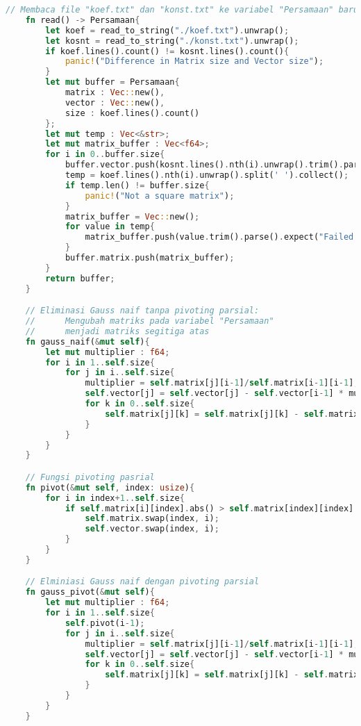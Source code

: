 \documentclass[12pt]{article}
\begin{document}
\begin{enumerate}
{\begin{lstlisting}[language=Rust, style=colouredRust, basicstyle=\fontsize{7.5pt}{10pt}\selectfont\color{white}\ttfamily]
    // Membaca file "koef.txt" dan "konst.txt" ke variabel "Persamaan" baru
    fn read() -> Persamaan{
        let koef = read_to_string("./koef.txt").unwrap();
        let kosnt = read_to_string("./konst.txt").unwrap();
        if koef.lines().count() != kosnt.lines().count(){
            panic!("Difference in Matrix size and Vector size");
        }
        let mut buffer = Persamaan{
            matrix : Vec::new(),
            vector : Vec::new(),
            size : koef.lines().count()
        };
        let mut temp : Vec<&str>;
        let mut matrix_buffer : Vec<f64>;
        for i in 0..buffer.size{
            buffer.vector.push(kosnt.lines().nth(i).unwrap().trim().parse().expect("Failed to parse"));
            temp = koef.lines().nth(i).unwrap().split(' ').collect();
            if temp.len() != buffer.size{
                panic!("Not a square matrix");
            }
            matrix_buffer = Vec::new();
            for value in temp{
                matrix_buffer.push(value.trim().parse().expect("Failed to parse"));
            }
            buffer.matrix.push(matrix_buffer);
        }
        return buffer;
    }

    // Eliminasi Gauss naif tanpa pivoting parsial:
    //      Mengubah matriks pada variabel "Persamaan"
    //      menjadi matriks segitiga atas
    fn gauss_naif(&mut self){
        let mut multiplier : f64;
        for i in 1..self.size{
            for j in i..self.size{
                multiplier = self.matrix[j][i-1]/self.matrix[i-1][i-1];
                self.vector[j] = self.vector[j] - self.vector[i-1] * multiplier;
                for k in 0..self.size{
                    self.matrix[j][k] = self.matrix[j][k] - self.matrix[i-1][k] * multiplier;
                }
            }
        }
    }

    // Fungsi pivoting pasrial
    fn pivot(&mut self, index: usize){
        for i in index+1..self.size{
            if self.matrix[i][index].abs() > self.matrix[index][index].abs(){
                self.matrix.swap(index, i);
                self.vector.swap(index, i);
            }
        }
    }

    // Elminiasi Gauss naif dengan pivoting parsial
    fn gauss_pivot(&mut self){
        let mut multiplier : f64;
        for i in 1..self.size{
            self.pivot(i-1);
            for j in i..self.size{
                multiplier = self.matrix[j][i-1]/self.matrix[i-1][i-1];
                self.vector[j] = self.vector[j] - self.vector[i-1] * multiplier;
                for k in 0..self.size{
                    self.matrix[j][k] = self.matrix[j][k] - self.matrix[i-1][k] * multiplier;
                }
            }
        }
    }


\end{lstlisting}}
\end{enumerate}
\end{document}
